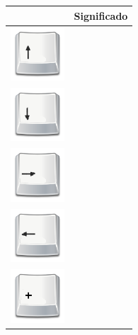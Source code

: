 \begin{table}[H]
  \begin{center}
    \begin{tabular}{|p{2cm}|p{10cm}|}
      \hline
      \centering{Tecla} & \qquad \quad Significado \\
      \hline
      \includegraphics[width=2cm]{../imagenes/flecha_arriba.png} & \vspace*{-.8in}{Avanzar. Orden de movimiento frontal, el vehículo se detiene al soltar la tecla.} \\
      \hline
      \includegraphics[width=2cm]{../imagenes/flecha_abajo.png} & \vspace*{-.8in}{Retroceder. Orden de movimiento en retroceso, el vehículo se detiene al soltar la tecla.} \\
      \hline
      \includegraphics[width=2cm]{../imagenes/flecha_derecha.png} & \vspace*{-.8in}{Giro cerrado a la derecha. Orden de giro a la derecha, el vehículo se detiene al soltar la tecla.} \\
      \hline
      \includegraphics[width=2cm]{../imagenes/flecha_izquierda.png} & \vspace*{-.8in}{Giro cerrado a la izquierda. Orden de giro a la izquierda, el vehículo se detiene al soltar la tecla.} \\
      \hline

      \hline
      \includegraphics[width=2cm]{../imagenes/tecla_mas.png} & \vspace*{-.8in}{Incremento de velocidad. Se incrementa en una unidad la velocidad del vehículo.} \\
      \hline


\end{tabular}
\end{center}
\end{table}

